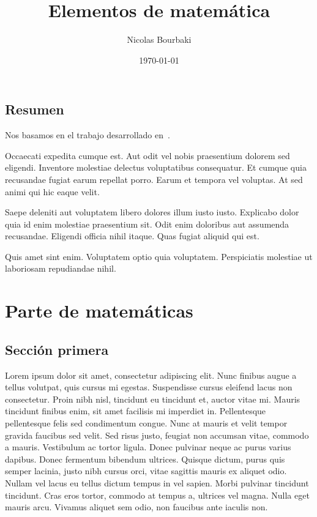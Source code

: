 \documentclass[oneside,openright,titlepage,numbers=noenddot,openany,headinclude,footinclude=true,
cleardoublepage=empty,abstractoff,BCOR=5mm,paper=a4,fontsize=12pt,ngerman,spanish]{scrreprt}
\author{Nicolas Bourbaki} %
\date{\today} %
\title{Elementos de matemática} %
\begin{document}
\maketitle
\tableofcontents


\chapter*{Resumen}

Nos basamos en el trabajo desarrollado en~\cite{turing1936a}.

Occaecati expedita cumque est. Aut odit vel nobis praesentium dolorem
sed eligendi. Inventore molestiae delectus voluptatibus
consequatur. Et cumque quia recusandae fugiat earum repellat
porro. Earum et tempora vel voluptas. At sed animi qui hic eaque
velit.

Saepe deleniti aut voluptatem libero dolores illum iusto
iusto. Explicabo dolor quia id enim molestiae praesentium sit. Odit
enim doloribus aut assumenda recusandae. Eligendi officia nihil
itaque. Quas fugiat aliquid qui est.

Quis amet sint enim. Voluptatem optio quia voluptatem. Perspiciatis
molestiae ut laboriosam repudiandae nihil.


\part{Parte de matemáticas}

\chapter{Sección primera}

Lorem ipsum dolor sit amet, consectetur adipiscing elit. Nunc finibus
augue a tellus volutpat, quis cursus mi egestas. Suspendisse cursus
eleifend lacus non consectetur. Proin nibh nisl, tincidunt eu
tincidunt et, auctor vitae mi. Mauris tincidunt finibus enim, sit amet
facilisis mi imperdiet in. Pellentesque pellentesque felis sed
condimentum congue. Nunc at mauris et velit tempor gravida faucibus
sed velit. Sed risus justo, feugiat non accumsan vitae, commodo a
mauris. Vestibulum ac tortor ligula. Donec pulvinar neque ac purus
varius dapibus. Donec fermentum bibendum ultrices. Quisque dictum,
purus quis semper lacinia, justo nibh cursus orci, vitae sagittis
mauris ex aliquet odio. Nullam vel lacus eu tellus dictum tempus in
vel sapien. Morbi pulvinar tincidunt tincidunt. Cras eros tortor,
commodo at tempus a, ultrices vel magna. Nulla eget mauris
arcu. Vivamus aliquet sem odio, non faucibus ante iaculis non.
\end{document}
